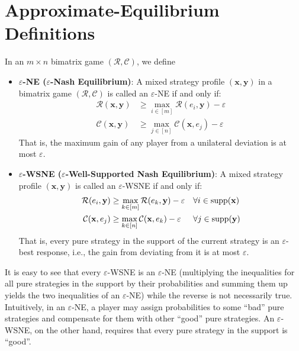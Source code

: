 \section{Approximate-Equilibrium Definitions}
\label{app:equilibrium-definitions}

In an \(m \times n\) bimatrix game \((\mathcal{R}, \mathcal{C})\), we define
\begin{itemize}
  \item \textbf{\(\varepsilon\)-NE (\(\varepsilon\)-Nash Equilibrium)}: A mixed strategy profile \((\mathbf{x}, \mathbf{y})\) in a bimatrix game \((\mathcal{R}, \mathcal{C})\) is called an \(\varepsilon\)-NE if and only if:
        \begin{align*}
          \mathcal{R}(\mathbf{x}, \mathbf{y}) & \ge \max_{i \in [m]} \mathcal{R}(e_i, \mathbf{y}) - \varepsilon \\
          \mathcal{C}(\mathbf{x}, \mathbf{y}) & \ge \max_{j \in [n]} \mathcal{C}(\mathbf{x}, e_j) - \varepsilon
        \end{align*}
        That is, the maximum gain of any player from a unilateral deviation is at most \(\varepsilon\).

  \item \textbf{\(\varepsilon\)-WSNE (\(\varepsilon\)-Well-Supported Nash Equilibrium)}: A mixed strategy profile \((\mathbf{x}, \mathbf{y})\) is called an \(\varepsilon\)-WSNE if and only if:
        \begin{align*}
          \mathcal{R}(e_i, \mathbf{y}) & \ge \max_{k \in [m]} \mathcal{R}(e_k, \mathbf{y}) - \varepsilon &  & \forall i \in \operatorname{supp}(\mathbf{x}) \\
          \mathcal{C}(\mathbf{x}, e_j) & \ge \max_{k \in [n]} \mathcal{C}(\mathbf{x}, e_k) - \varepsilon &  & \forall j \in \operatorname{supp}(\mathbf{y})
        \end{align*}
        That is, every pure strategy in the support of the current strategy is an \(\varepsilon\)-best response, i.e., the gain from deviating from it is at most \(\varepsilon\).
\end{itemize}

It is easy to see that every \(\varepsilon\)-WSNE is an \(\varepsilon\)-NE (multiplying the inequalities for all pure strategies in the support by their probabilities and summing them up yields the two inequalities of an \(\varepsilon\)-NE) while the reverse is not necessarily true. Intuitively, in an \(\varepsilon\)-NE, a player may assign probabilities to some ``bad'' pure strategies and compensate for them with other ``good'' pure strategies. An \(\varepsilon\)-WSNE, on the other hand, requires that every pure strategy in the support is ``good''.
